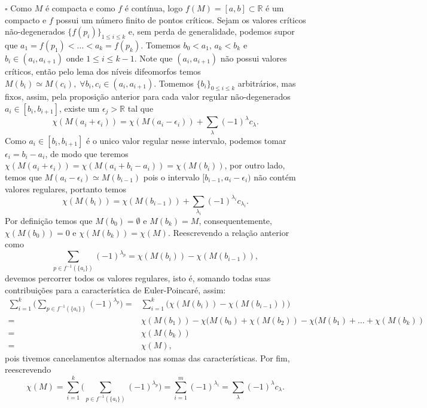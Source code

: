 \documentclass{article}
\begin{document}
	$\square$ Como $M$ é compacta e como $f$ é contínua, logo $f(M) = [a,b] \subset \mathbb{R}$ é um compacto e $f$ possui um número finito de pontos críticos. Sejam  os valores críticos não-degenerados $\{f(p_{i})\}_{1\leq i \leq k}$ e, sem perda de generalidade, podemos supor que $a_{1} = f(p_{1}) < \dots < a_{k}=f(p_{k})$. Tomemos $b_{0} < a_{1}$, $a_{k} < b_{k}$ e $b_{i} \in (a_{i}, a_{i+1})$ onde $1\leq i \leq k-1$. Note que $(a_{i}, a_{i+1})$ não possui valores críticos, então pelo lema dos níveis difeomorfos temos $M(b_{i}) \simeq M(c_{i}), \; \forall b_{i}, c_{i} \in (a_{i}, a_{i+1})$. Tomemos $\{b_{i}\}_{0\leq i \leq k}$ arbitrários, mas fixos, assim, pela proposição anterior para cada valor regular não-degenerados $a_{i} \in [b_{i}, b_{i+1}]$, existe um $\epsilon_{j} > \mathbb{R}$ tal que
	$$
	\chi(M(a_{i} + \epsilon_{i})) = \chi(M(a_{i}-\epsilon_{i})) + \sum_{\lambda}(-1)^{\lambda}c_{\lambda}.
	$$
	Como $a_{i} \in [b_{i}, b_{i+1}]$ é o unico valor regular nesse intervalo, podemos tomar $\epsilon_{i} = b_{i} - a_{i}$, de modo que teremos $\chi(M(a_{i} + \epsilon_{i})) = \chi(M(a_{i} + b_{i} - a_{i})) = \chi(M(b_{i}))$, por outro lado, temos que $M(a_{i} - \epsilon_{i}) \simeq M(b_{i-1})$ pois o intervalo $[b_{i-1}, a_{i} - \epsilon_{i})$ não contém valores regulares, portanto temos
	$$
	\chi(M(b_{i})) = \chi(M(b_{i-1})) + \sum_{\lambda_{i}}(-1)^{\lambda_{i}}c_{\lambda_{i}}.
	$$
	Por definição temos que $M(b_{0}) = \emptyset$ e $M(b_{k}) = M$, consequentemente, $\chi(M(b_{0}))=0$ e $\chi(M(b_{k}))=\chi(M)$. Reescrevendo a relação anterior como
	$$
	\sum_{p \in f^{-1}(\{a_{i}\})}(-1)^{\lambda_{p}} = 	\chi(M(b_{i})) - \chi(M(b_{i-1})),
	$$
	devemos percorrer todos os valores regulares, isto é, somando todas suas contribuições para a característica de Euler-Poincaré, assim:
	$$
	\begin{aligned}
	\sum_{i=1}^{k} \Big(\sum_{p \in f^{-1}(\{a_{i}\})}(-1)^{\lambda_{p}}\Big) =& 		\sum_{i=1}^{k} \Big(\chi(M(b_{i})) - \chi(M(b_{i-1}))\Big)
	\\ 
	=&  \chi(M(b_{1})) - \chi(M(b_{0}) + \chi(M(b_{2})) - \chi(M(b_{1}) + \dots + \chi(M(b_{k}))
	\\
	=& \chi(M(b_{k})) 
	\\
	=& \chi(M),
	\end{aligned}$$
	pois tivemos cancelamentos alternados nas somas das características. Por fim, reescrevendo
	$$
	\chi(M)	= \sum_{i=1}^{k} \Big(\sum_{p \in f^{-1}(\{a_{i}\})}(-1)^{\lambda_{p}}\Big) = \sum_{i=1}^{m}(-1)^{\lambda_{i}} = \sum_{\lambda}(-1)^{\lambda}c_{\lambda}.
	$$
	
\end{document}
